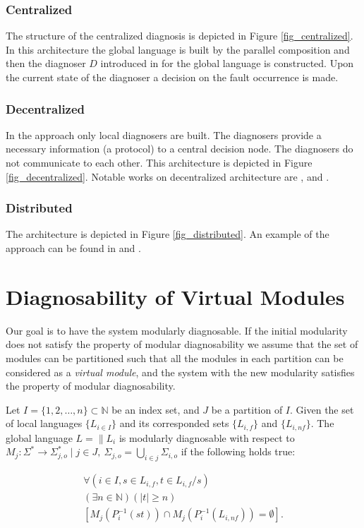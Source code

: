 \documentclass[a4paper, 10pt, conference]{ieeeconf}
\begin{document}
\subsubsection{Centralized}
The structure of the centralized diagnosis is depicted in
Figure \ref{fig_centralized}. In this architecture the global language is
built by the parallel composition and then the diagnoser $D$ introduced in
\cite{sampath_diagnosability_1995} for the global language is constructed. Upon
the current state of the diagnoser a decision on the fault occurrence is made.

\subsubsection{Decentralized}
In the approach only local diagnosers are built.
The diagnosers provide a necessary information (a protocol) to a central
decision node. The diagnosers do not communicate to each other. This
architecture is depicted in Figure \ref{fig_decentralized}.
Notable works on decentralized architecture are
\cite{debouk_coordinated_1998},
\cite{contant_diagnosability_2006} and \cite{wang_diagnosis_2007}.

\subsubsection{Distributed}
The architecture is depicted in Figure \ref{fig_distributed}.
An example of the approach can be found in \cite{pencole_formal_2005} and
\cite{schumann_decentralised_2010}.


\section{Diagnosability of Virtual Modules}
\label{sec:Proposal}

Our goal is to have the system modularly diagnosable. If the initial modularity
does not satisfy the property of modular diagnosability we assume that the set
of modules can be partitioned such that all the modules in each partition can be
considered as a \emph{virtual module}, and the system with the new modularity
satisfies the property of modular diagnosability.

\begin{definition} Let $I = \{1,2,\ldots,n\}
\subset  \mathbb{N}$ be an index set, and $J$ be a partition of $I$. Given the
set of local languages $\{L_{i \in I}\}$ and its corresponded sets $\{L_{i,f}\}$
and $\{L_{i,nf}\}$. The global language $L = \parallel L_i$ is modularly
diagnosable with respect to 
$M_j: \Sigma^* \rightarrow \Sigma_{j,o}^* 
\mid j \in J, ~\Sigma_{j,o} =\bigcup_{i \in j} \Sigma_{i,o}$ 
if the following holds true:
\end{definition}
\begin{equation}
\begin{array}{l}
	\forall(i \in I, s \in L_{i,f}, t \in L_{i,f}/s)
	\\
	(\exists n \in \mathbb{N})
	(|t| \geq n)
	\\
	\left[ M_j(P_i^{-1}(st)) \cap M_j(P_i^{-1}(L_{i,nf})) = \emptyset \right].
\end{array}
\end{equation}
\end{document}

